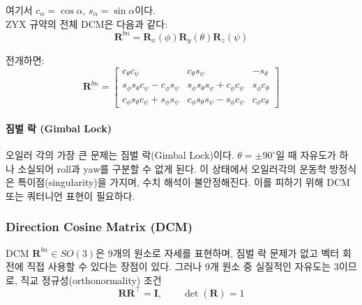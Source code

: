            \noindent 여기서 $c_\alpha = \cos\alpha$, $s_\alpha = \sin\alpha$이다.\\

            ZYX 규약의 전체 DCM은 다음과 같다:\\

            \begin{equation}
                \mathbf{R}^{bn} = \mathbf{R}_x(\phi)\mathbf{R}_y(\theta)\mathbf{R}_z(\psi)
                \label{eq:dcm_euler}
            \end{equation}

            전개하면:\\

            \begin{equation}
                \mathbf{R}^{bn} = \begin{bmatrix}
                    c_\theta c_\psi & c_\theta s_\psi & -s_\theta \\
                    s_\phi s_\theta c_\psi - c_\phi s_\psi & s_\phi s_\theta s_\psi + c_\phi c_\psi & s_\phi c_\theta \\
                    c_\phi s_\theta c_\psi + s_\phi s_\psi & c_\phi s_\theta s_\psi - s_\phi c_\psi & c_\phi c_\theta
                \end{bmatrix}
                \label{eq:dcm_zyx_full}
            \end{equation}

            \paragraph{짐벌 락 (Gimbal Lock)}
                오일러 각의 가장 큰 문제는 짐벌 락(Gimbal Lock)이다. $\theta = \pm 90^\circ$일 때 자유도가 하나 소실되어 roll과 yaw를 구분할 수 없게 된다. 이 상태에서 오일러각의 운동학 방정식은 특이점(singularity)을 가지며, 수치 해석이 불안정해진다. 이를 피하기 위해 DCM 또는 쿼터니언 표현이 필요하다.\\
                
        \subsubsection{Direction Cosine Matrix (DCM)}
            DCM $\mathbf{R}^{bn} \in SO(3)$은 9개의 원소로 자세를 표현하며, 짐벌 락 문제가 없고 벡터 회전에 직접 사용할 수 있다는 장점이 있다. 그러나 9개 원소 중 실질적인 자유도는 3이므로, 직교 정규성(orthonormality) 조건\\

            \begin{equation}
                \mathbf{R}\mathbf{R}^\top = \mathbf{I}, \qquad \det(\mathbf{R}) = 1
                \label{eq:orthonormal}
            \end{equation}

